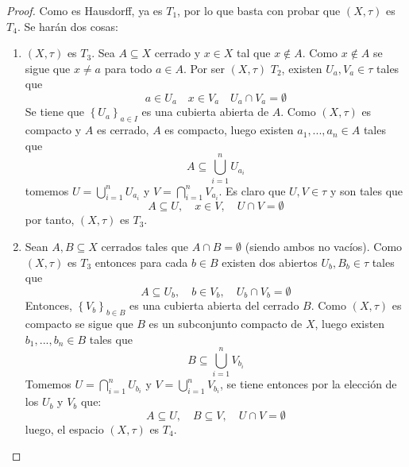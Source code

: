\documentclass[12pt]{report}
\theoremstyle{largebreak}
\begin{document}
    \begin{proof}
        Como es Hausdorff, ya es $T_1$, por lo que basta con probar que $(X,\tau)$ es $T_4$. Se harán dos cosas:
        \begin{enumerate}
            \item $(X,\tau)$ es $T_3$. Sea $A\subseteq X$ cerrado y $x\in X$ tal que $x\notin A$. Como $x\notin A$ se sigue que $x\neq a$ para todo $a\in A$. Por ser $(X,\tau)$ $T_2$, existen $U_a,V_a\in\tau$ tales que
            \begin{equation*}
                a\in U_a\quad x\in V_a\quad U_a\cap V_a=\emptyset
            \end{equation*}
            Se tiene que $\left\{U_a\right\}_{a\in I}$ es una cubierta abierta de $A$. Como $(X,\tau)$ es compacto y $A$ es cerrado, $A$ es compacto, luego existen $a_1,...,a_n\in A$ tales que
            \begin{equation*}
                A\subseteq\bigcup_{ i=1}^n U_{a_i}
            \end{equation*}
            tomemos $U=\bigcup_{ i=1}^n U_{a_i}$ y $V=\bigcap_{ i=1}^n V_{a_i}$. Es claro que $U,V\in\tau$ y son tales que
            \begin{equation*}
                A\subseteq U,\quad x\in V,\quad U\cap V=\emptyset 
            \end{equation*}
            por tanto, $(X,\tau)$ es $T_3$.
            \item Sean $A,B\subseteq X$ cerrados tales que $A\cap B=\emptyset$ (siendo ambos no vacíos). Como $(X,\tau)$ es $T_3$ entonces para cada $b\in B$ existen dos abiertos $U_b,B_b\in\tau$ tales que
            \begin{equation*}
                A\subseteq U_b,\quad b\in V_b,\quad U_b\cap V_b=\emptyset
            \end{equation*}
            Entonces, $\left\{V_b \right\}_{b\in B}$ es una cubierta abierta del cerrado $B$. Como $(X,\tau)$ es compacto se sigue que $B$ es un subconjunto compacto de $X$, luego existen $b_1,...,b_n\in B$ tales que
            \begin{equation*}
                B\subseteq \bigcup_{ i=1}^n V_{ b_i}
            \end{equation*}
            Tomemos $U=\bigcap_{ i=1}^n U_{ b_i}$ y $V=\bigcup_{ i=1}^n V_{ b_i}$, se tiene entonces por la elección de los $U_b$ y $V_b$ que:
            \begin{equation*}
                A\subseteq U,\quad B\subseteq V,\quad U\cap V=\emptyset 
            \end{equation*}
            luego, el espacio $(X,\tau)$ es $T_4$.
        \end{enumerate}
    \end{proof}
    
\end{document}
